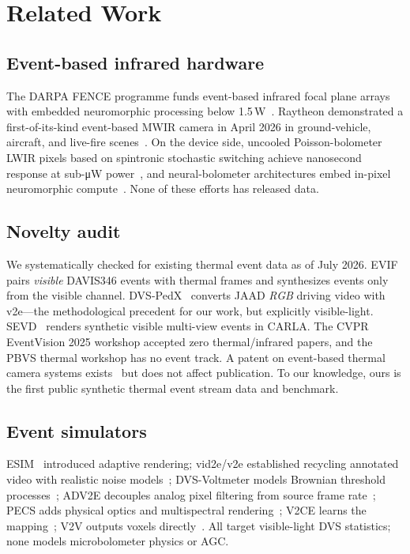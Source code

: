 \section{Related Work}
\label{sec:related}

\subsection{Event-based infrared hardware}
The DARPA FENCE programme funds event-based infrared focal plane arrays with
embedded neuromorphic processing below 1.5\,W~\cite{fence}. Raytheon
demonstrated a first-of-its-kind event-based MWIR camera in April 2026 in
ground-vehicle, aircraft, and live-fire scenes~\cite{raytheon2026}. On the
device side, uncooled Poisson-bolometer LWIR pixels based on spintronic
stochastic switching achieve nanosecond response at sub-\si{\micro\watt}
power~\cite{mousa2026poisson}, and neural-bolometer architectures embed
in-pixel neuromorphic compute~\cite{neuralbolometers2026}. None of these
efforts has released data.

\subsection{Novelty audit}
We systematically checked for existing thermal event data as of July 2026.
EVIF~\cite{geng2024evif} pairs \emph{visible} DAVIS346 events with thermal
frames and synthesizes events only from the visible channel.
DVS-PedX~\cite{sakhai2026dvspedx} converts JAAD \emph{RGB} driving video
with v2e---the methodological precedent for our work, but explicitly
visible-light. SEVD~\cite{sevd} renders synthetic visible multi-view events
in CARLA. The CVPR EventVision 2025 workshop accepted zero
thermal/infrared papers, and the PBVS thermal workshop has no event track.
A patent on event-based thermal camera systems exists~\cite{wo2022patent}
but does not affect publication. To our knowledge, ours is the first public
synthetic thermal event stream data and benchmark.

\subsection{Event simulators}
ESIM~\cite{rebecq2018esim} introduced adaptive rendering; vid2e/v2e
established recycling annotated video with realistic noise
models~\cite{gehrig2020vid2e,hu2021v2e}; DVS-Voltmeter models Brownian
threshold processes~\cite{lin2022voltmeter}; ADV2E decouples analog pixel
filtering from source frame rate~\cite{jiang2024adv2e}; PECS adds physical
optics and multispectral rendering~\cite{han2024pecs}; V2CE learns the
mapping~\cite{zhang2024v2ce}; V2V outputs voxels directly~\cite{lou2025v2v}.
All target visible-light DVS statistics; none models microbolometer
physics or AGC.

